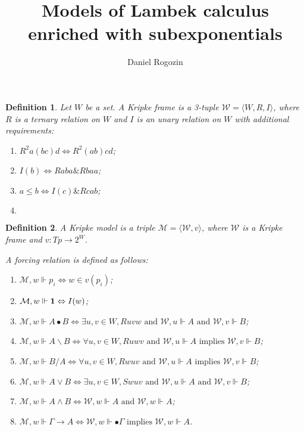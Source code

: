 \documentclass[a4paper]{article}
\date{}
\author[1,2]{Daniel Rogozin}
\affil[1]{Lomonosov Moscow State University}
\affil[2]{Serokell O\"{U}}
\title{Models of Lambek calculus enriched with subexponentials}
\theoremstyle{defin}
\newtheorem{defin}{Definition}
\theoremstyle{theorem}
\theoremstyle{prop}
\theoremstyle{lemma}
\theoremstyle{ex}
\theoremstyle{col}
\begin{document}
\maketitle

\begin{defin}
  Let $W$ be a set. A Kripke frame is a 3-tuple $\mathcal{W} = \langle W, R, I\rangle$,
  where $R$ is a ternary relation on $W$ and $I$ is an unary relation on $W$ with additional requirements:

\begin{enumerate}
    \item $R^2 a (b c) d \Leftrightarrow R^2 (a b) c d$;
    \item $I(b) \Leftrightarrow R a b a \& R b a a$;
    \item $a \leq b \Leftrightarrow I(c) \& R c a b$;
    \item $ $
\end{enumerate}
\end{defin}

\begin{defin}
  A Kripke model is a triple $\mathcal{M} = \langle \mathcal{W}, v \rangle$, where
  $\mathcal{W}$ is a Kripke frame and $v : Tp \to 2^W$.

  A forcing relation is defined as follows:

  \begin{enumerate}
    \item $\mathcal{M}, w \Vdash p_i \Leftrightarrow w \in v(p_i)$;
    \item $\mathcal{M}, w \Vdash {\bf 1} \Leftrightarrow I(w)$;
    \item $\mathcal{M}, w \Vdash A \bullet B \Leftrightarrow \exists u, v \in W, R u v w \text{ and } \mathcal{W}, u \Vdash A \text{ and } \mathcal{W}, v \Vdash B$;
    \item $\mathcal{M}, w \Vdash A \backslash B \Leftrightarrow \forall u, v \in W, R u w v \text{ and } \mathcal{W}, u \Vdash A \text{ implies } \mathcal{W}, v \Vdash B$;
    \item $\mathcal{M}, w \Vdash B / A \Leftrightarrow \forall u, v \in W, R w u v \text{ and } \mathcal{W}, u \Vdash A \text{ implies } \mathcal{W}, v \Vdash B$;
    \item $\mathcal{M}, w \Vdash A \lor B \Leftrightarrow \exists u, v \in W, S w u v \text{ and } \mathcal{W}, u \Vdash A \text{ and } \mathcal{W}, v \Vdash B$;
    \item $\mathcal{M}, w \Vdash A \land B \Leftrightarrow \mathcal{W}, w \Vdash A \text{ and } \mathcal{W}, w \Vdash A$;
    \item $\mathcal{M}, w \Vdash \Gamma \rightarrow A \Leftrightarrow \mathcal{W}, w \Vdash \bullet \Gamma \text{ implies } \mathcal{W}, w \Vdash A$.
  \end{enumerate}
\end{defin}
\end{document}
